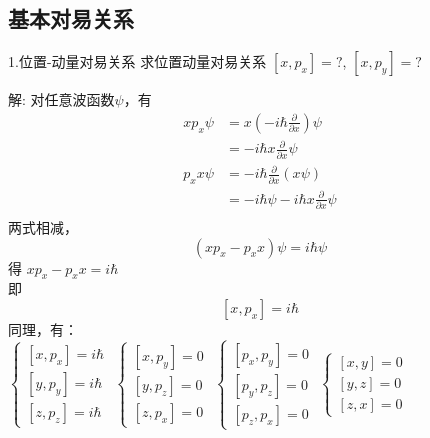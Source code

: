 \subsection{基本对易关系}

\begin{frame} [allowframebreaks=]
    \begin{tcolorbox1}{1.位置-动量对易关系}
        求位置动量对易关系 $[x,p_x]=?$,  $[x,p_y]=?$
    \end{tcolorbox1}
    \alert{解:} 对任意波函数$\psi$，有
    \begin{equation*}
        \begin{split}
        xp_x\psi&= x(-i\hbar \frac{\partial}{\partial x})\psi \\
        &=-i\hbar x \frac{\partial}{\partial x}\psi\\
        p_x x \psi&= -i\hbar \frac{\partial}{\partial x} (x\psi) \\
        &=-i\hbar\psi - i\hbar x \frac{\partial}{\partial x}\psi \\
        \end{split}  
    \end{equation*}
    两式相减，$$(xp_x-p_x x)\psi= i\hbar\psi$$
    得 $xp_x-p_x x= i\hbar$ \\ \vspace{0.3em}
    即 $$\boxed{[x,p_x]= i\hbar}$$
    同理，有：\\
    $\begin{cases}
        [x,p_x]= i\hbar  \\ 
        [y,p_y]= i\hbar  \\ 
        [z,p_z]= i\hbar  
    \end{cases}$
    $\begin{cases}
        [x,p_y]= 0  \\ 
        [y,p_z]= 0  \\ 
        [z,p_x]= 0  
    \end{cases}$
    $\begin{cases}
        [p_x,p_y]= 0  \\ 
        [p_y,p_z]= 0  \\ 
        [p_z,p_x]= 0  
    \end{cases}$
    $\begin{cases}
        [x,y]= 0  \\ 
        [y,z]= 0  \\ 
        [z,x]= 0  
    \end{cases}$ \\
\end{frame} 

